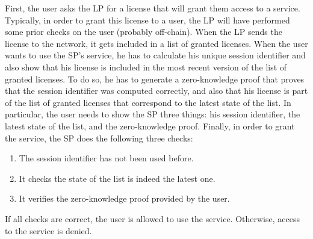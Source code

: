 First, the user asks the LP for a license that will grant them access to a service. Typically, in order to grant this license to a user, the LP will have performed some prior checks on the user (probably off-chain). When the LP sends the license to the network, it gets included in a list of granted licenses. When the user wants to use the SP's service, he has to calculate his unique session identifier and also show that his license is included in the most recent version of the list of granted licenses. To do so, he has to generate a zero-knowledge proof that proves that the session identifier was computed correctly, and also that his license is part of the list of granted licenses that correspond to the latest state of the list. In particular, the user needs to show the SP three things: his session identifier, the latest state of the list, and the zero-knowledge proof. Finally, in order to grant the service, the SP does the following three checks:

\begin{enumerate}
	\item The session identifier has not been used before.
	\item It checks the state of the list is indeed the latest one.
	\item It verifies the zero-knowledge proof provided by the user.	
\end{enumerate}
If all checks are correct, the user is allowed to use the service. Otherwise, access to the service is denied.

